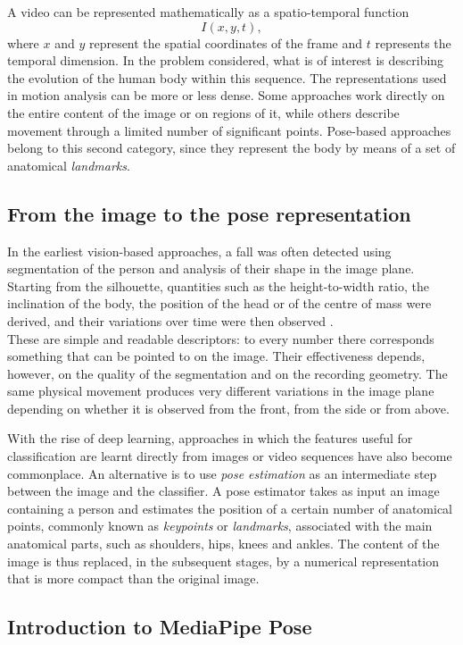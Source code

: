 A video can be represented mathematically as a spatio-temporal function
\[
I(x,y,t),
\]
where $x$ and $y$ represent the spatial coordinates of the frame and $t$ represents the temporal dimension. In the problem considered, what is of interest is describing the evolution of the human body within this sequence.
The representations used in motion analysis can be more or less dense. Some approaches work directly on the entire content of the image or on regions of it, while others describe movement through a limited number of significant points. Pose-based approaches belong to this second category, since they represent the body by means of a set of anatomical \emph{landmarks}.

\subsection{From the image to the pose representation}

In the earliest vision-based approaches, a fall was often detected using segmentation of the person and analysis of their shape in the image plane. Starting from the silhouette, quantities such as the height-to-width ratio, the inclination of the body, the position of the head or of the centre of mass were derived, and their variations over time were then observed \cite{MU}.\\
These are simple and readable descriptors: to every number there corresponds something that can be pointed to on the image. Their effectiveness depends, however, on the quality of the segmentation and on the recording geometry. The same physical movement produces very different variations in the image plane depending on whether it is observed from the front, from the side or from above.

With the rise of deep learning, approaches in which the features useful for classification are learnt directly from images or video sequences have also become commonplace. An alternative is to use \emph{pose estimation} as an intermediate step between the image and the classifier. A pose estimator takes as input an image containing a person and estimates the position of a certain number of anatomical points, commonly known as \emph{keypoints} or \emph{landmarks}, associated with the main anatomical parts, such as shoulders, hips, knees and ankles. The content of the image is thus replaced, in the subsequent stages, by a numerical representation that is more compact than the original image.

\subsection{Introduction to MediaPipe Pose}

